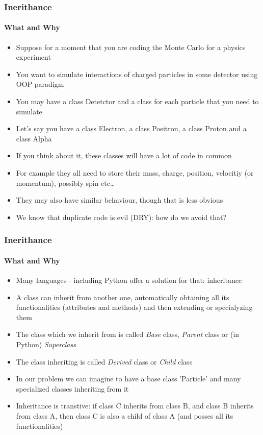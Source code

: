 \documentclass[9pt]{beamer}
\begin{document}
\begin{frame}
  \frametitle{Inerithance}
  \framesubtitle{What and Why}
    
  \begin{itemize}
    \small
    \item Suppose for a moment that you are coding the Monte Carlo for a physics experiment
    \medskip
    \item You want to simulate interactions of charged particles in some detector using OOP paradigm
    \medskip
    \item You may have a class Detetctor and a class for each particle that you need to simulate
    \medskip
    \item Let's say you have a class Electron, a class Positron, a class Proton and a class Alpha
    \medskip
    \item If you think about it, these classes will have a lot of code in common
    \medskip
    \item For example they all need to store their mass, charge, position, velocitiy (or momentum), possibly spin etc\dots
    \medskip
    \item They may also have similar behaviour, though that is less obvious
    \medskip
    \item We know that duplicate code is evil (DRY): how do we avoid that?
  \end{itemize}
  
\end{frame}


\begin{frame}
  \frametitle{Inerithance}
  \framesubtitle{What and Why}
    
  \begin{itemize}
    \small
    \item Many languages - including Python offer a solution for that: \alert{inheritance}
    \medskip
    \item A class can inherit from another one, automatically obtaining all its functionalities (attributes and methods) and then extending or specialyzing them
    \medskip
    \item The class which we inherit from is called \emph{Base} class, \emph{Parent} class or (in Python) \emph{Superclass}
    \medskip
    \item The class inheriting is called \emph{Derived} class or \emph{Child} class
    \medskip
    \item In our problem we can imagine to have a base class 'Particle' and many specialized classes inheriting from it
    \medskip
    \item Inheritance is transtive: if class C inherits from class B, and class B inherits from class A, then class C is also a child of class A (and posses all its functionalities)
  \end{itemize}
  
\end{frame}
\end{document}

